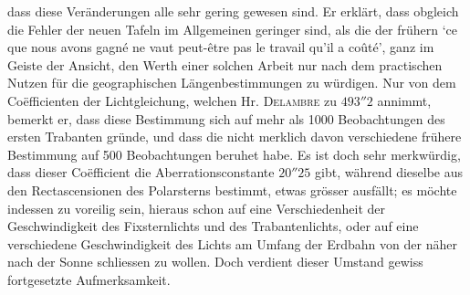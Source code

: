 dass diese Veränderungen alle sehr gering gewesen sind. Er erklärt, dass obgleich die Fehler der neuen
Tafeln im Allgemeinen geringer sind, als die der frühern `ce que nous avons gagné ne vaut peut-être
pas le travail qu'il a coûté', ganz im Geiste der Ansicht, den Werth einer solchen Arbeit nur nach
dem practischen Nutzen für die geographischen Längenbestimmungen zu würdigen. Nur von dem Coëfficienten
der Lichtgleichung, welchen Hr. \textsc{Delambre} zu $493''2$ annimmt, bemerkt er, dass diese Bestimmung
sich auf mehr als 1000 Beobachtungen des ersten Trabanten gründe, und dass die nicht merklich
davon verschiedene frühere Bestimmung auf 500 Beobachtungen beruhet habe. Es ist doch sehr merkwürdig,
dass dieser Coëfficient die Aberrationsconstante $20''25$ gibt, während dieselbe aus den Rectascensionen
des Polarsterns bestimmt, etwas grösser ausfällt; es möchte indessen zu voreilig sein, hieraus
schon auf eine Verschiedenheit der Geschwindigkeit des Fixsternlichts und des Trabantenlichts, oder
auf eine verschiedene Geschwindigkeit des Lichts am Umfang der Erdbahn von der näher nach der
Sonne schliessen zu wollen. Doch verdient dieser Umstand gewiss fortgesetzte Aufmerksamkeit.
